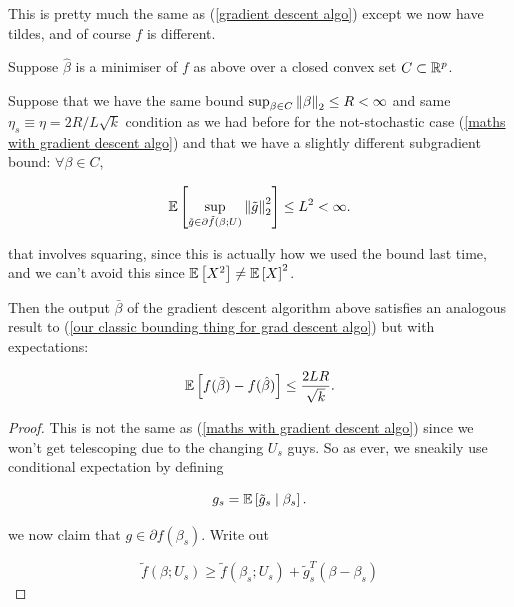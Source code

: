 \documentclass[11pt]{scrartcl}
\begin{document}
\begin{remark}
This is pretty much the same as (\ref{gradient descent algo}) except we now have tildes, and of course $f$ is different.
\end{remark}

\begin{theorem}
Suppose $\hat{\beta}$ is a minimiser of $f$ as above over a closed convex set $C \subset \mathbb R^p$. 

Suppose that we have the same bound $\sup_{\beta \in C} \left\lVert\beta\right\rVert_2 \le R < \infty$ and same $\eta_s \equiv \eta = 2R / L\sqrt{k}$ condition as we had before for the not-stochastic case (\ref{maths with gradient descent algo}) and that we have a slightly different subgradient bound: $\forall \beta \in C$,

\begin{equation}
    \mathbb{E} \left[ \sup_{\tilde{g} \in \partial \tilde{f} (\beta; U)} \left\lVert\tilde{g}\right\rVert_2^2 \right] \le L^2 < \infty.
\end{equation}

that involves squaring, since this is actually how we used the bound last time, and we can't avoid this since $\mathbb{E} \left[ X^2 \right] \neq \mathbb{E} \left[ X \right]^2$.

Then the output $\bar{\beta}$ of the gradient descent algorithm above satisfies an analogous result to (\ref{our classic bounding thing for grad descent algo}) but with expectations:

\begin{equation}
    \mathbb{E} \left[ f(\bar{\beta}) - f(\hat{\beta}) \right] \le \frac{2LR}{\sqrt{k}}.
\end{equation}

\begin{proof}
This is not the same as (\ref{maths with gradient descent algo}) since we won't get telescoping due to the changing $U_s$ guys. So as ever, we sneakily use conditional expectation by defining

\begin{equation}
    g_s = \mathbb{E} \left[ \tilde{g}_s \mid \beta_s \right].
\end{equation}

we now claim that $g \in \partial f(\beta_s)$. Write out

\begin{equation}
    \tilde{f}(\beta; U_s) \ge \tilde{f}(\beta_s; U_s) + \tilde{g}_s^T (\beta - \beta_s)
\end{equation}


\end{proof}
\end{theorem}
\end{document}
